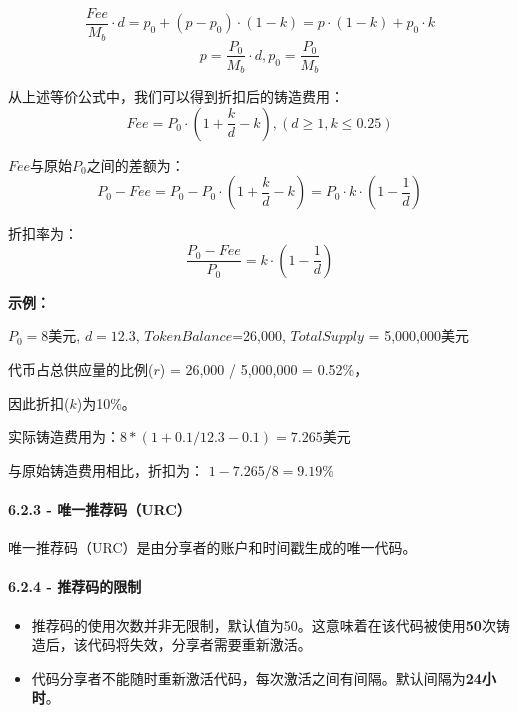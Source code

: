\documentclass[
]{article}
\begin{document}
\begin{equation}
\frac{Fee}{M_b} \cdot d = p_0 + (p - p_0) \cdot (1 - k) = p \cdot (1 - k) + p_0 \cdot k
\end{equation} \begin{equation}
p = \frac{P_0}{M_b} \cdot d, p_0 = \frac{P_0}{M_b}
\end{equation}

从上述等价公式中，我们可以得到折扣后的铸造费用： \begin{equation}
Fee = P_0 \cdot (1 + \frac{k}{d} - k),  (d \geq 1, k \leq 0.25)
\end{equation}

\(Fee\)与原始\(P_0\)之间的差额为： \begin{equation}
P_0 - Fee = P_0 - P_0 \cdot (1 + \frac{k}{d} - k) = P_0 \cdot k \cdot (1 - \frac{1}{d})
\end{equation}

折扣率为： \begin{equation}
\frac{P_0-Fee}{P_0} =k \cdot (1 - \frac{1}{d})
\end{equation}

\textbf{示例：}

\(P_0=8\)美元, \(d=12.3\), \(Token Balance\)=26,000, \(Total Supply\) =
5,000,000美元

代币占总供应量的比例(\(r\)) = 26,000 / 5,000,000 = 0.52\%，

因此折扣(\(k\))为10\%。

实际铸造费用为：\(8 * (1 + 0.1 / 12.3 - 0.1) = 7.265\)美元

与原始铸造费用相比，折扣为： \(1 - 7.265 / 8 = 9.19\)\%

\paragraph{6.2.3 -
唯一推荐码（URC）}\label{ux552fux4e00ux63a8ux8350ux7801urc}

唯一推荐码（URC）是由分享者的账户和时间戳生成的唯一代码。

\paragraph{6.2.4 -
推荐码的限制}\label{ux63a8ux8350ux7801ux7684ux9650ux5236}

\begin{itemize}
\item
  推荐码的使用次数并非无限制，默认值为50。这意味着在该代码被使用\textbf{50}次铸造后，该代码将失效，分享者需要重新激活。
\item
  代码分享者不能随时重新激活代码，每次激活之间有间隔。默认间隔为\textbf{24小时}。
\end{itemize}
\end{document}
